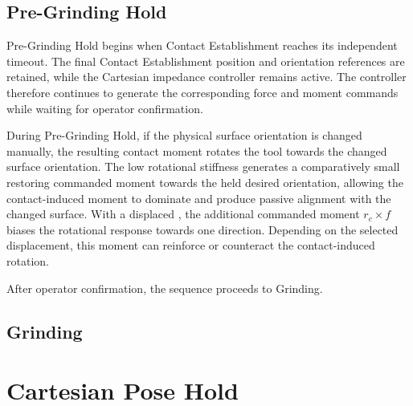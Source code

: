 \subsection{Pre-Grinding Hold}
\label{subsec:implementation_pre_grinding_hold}

Pre-Grinding Hold begins when Contact Establishment reaches its independent
timeout. The final Contact Establishment position and orientation references
are retained, while the Cartesian impedance controller remains active. The
controller therefore continues to generate the corresponding force and moment
commands while waiting for operator confirmation.

During Pre-Grinding Hold, if the physical surface orientation is changed
manually, the resulting contact moment rotates the tool towards the changed
surface orientation. The low rotational stiffness generates a comparatively
small restoring commanded moment towards the held desired orientation, allowing
the contact-induced moment to dominate and produce passive alignment with the
changed surface. With a displaced , the additional commanded moment
\mbox{\(r_c\times f\)} biases the rotational response towards one direction.
Depending on the selected  displacement, this moment can reinforce or
counteract the contact-induced rotation.

After operator confirmation, the sequence proceeds to Grinding.

\subsection{Grinding}
\label{subsec:implementation_grinding_phase}
\label{subsec:implementation_hold_guidance_modes}




\section{Cartesian Pose Hold}
\label{subsec:implementation_pose_hold}
\label{sec:nullspace_conditioning_implementation}

